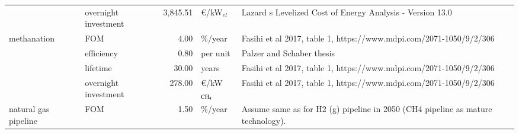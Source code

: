 \begin{longtable}{p{4cm}p{4cm}rp{3cm}p{10cm}}
                      & overnight investment &     3,845.51 &               \euro/kW$_{el}$ &                                                                                                                                                                                                                                                                            Lazard s Levelized Cost of Energy Analysis - Version 13.0 \\
methanation & FOM &         4.00 &                       \%/year &                                                                                                                                                                                                                                                                   Fasihi et al 2017, table 1, https://www.mdpi.com/2071-1050/9/2/306 \\
                      & efficiency &         0.80 &                      per unit &                                                                                                                                                                                                                                                                                                            Palzer and Schaber thesis \\
                      & lifetime &        30.00 &                         years &                                                                                                                                                                                                                                                                   Fasihi et al 2017, table 1, https://www.mdpi.com/2071-1050/9/2/306 \\
                      & overnight investment &       278.00 &         \euro/kW$_{\ce{CH4}}$ &                                                                                                                                                                                                                                                                   Fasihi et al 2017, table 1, https://www.mdpi.com/2071-1050/9/2/306 \\
natural gas pipeline & FOM &         1.50 &                       \%/year &                                                                                                                                                                                                                                                      Assume same as for H2 (g) pipeline in 2050 (CH4 pipeline as mature technology). \\

\end{longtable}
